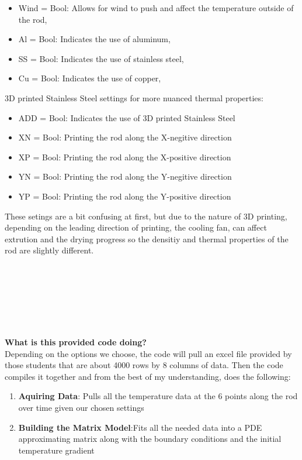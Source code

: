 \documentclass[11pt]{article}
\begin{document}
\begin{onehalfspace}
\begin{itemize}
        \item Wind = Bool: Allows for wind to push and affect the temperature outside of the rod,
        \item Al = Bool: Indicates the use of aluminum,
        \item SS = Bool: Indicates the use of stainless steel,
        \item Cu = Bool: Indicates the use of copper,
     \end{itemize}
    3D printed Stainless Steel settings for more nuanced thermal properties:
    \begin{itemize}
        \item ADD = Bool: Indicates the use of 3D printed Stainless Steel
        \item XN = Bool: Printing the rod along the X-negitive direction
        \item XP = Bool: Printing the rod along the X-positive direction
        \item YN = Bool: Printing the rod along the Y-negitive direction
        \item YP = Bool: Printing the rod along the Y-positive direction
    \end{itemize}
    These setings are a bit confusing at first, but due to the nature of 3D printing, depending on the leading direction of printing, 
    the cooling fan, can affect extrution and the drying progress so the densitiy and thermal properties of the rod are slightly different. \\
    \\\\\\\\\\\\\\
    \textbf{What is this provided code doing?} \\
    Depending on the options we choose, the code will pull an excel file provided by those students that are about 4000 rows by 8 columns of data. 
    Then the code compiles it together and from the best of my understanding, does the following:
    \begin{enumerate}
        \item \textbf{Aquiring Data}: Pulls all the temperature data at the 6 points along the rod over time given our chosen settings
        \item \textbf{Building the Matrix Model}:Fits all the needed data into a PDE approximating matrix along with the boundary conditions and the initial temperature gradient

\end{enumerate}
\end{onehalfspace}
\end{document}
